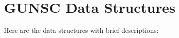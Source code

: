\section{GUNSC Data Structures}
Here are the data structures with brief descriptions:\begin{CompactList}
\item{}
\end{CompactList}
